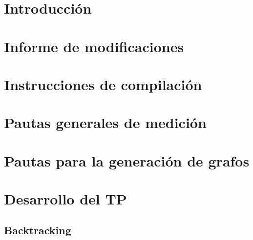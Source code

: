 \documentclass[12pt, a4paper, twoside]{article}
\begin{document}
{}

\newpage{\pagestyle{empty}\cleardoublepage}
\setcounter{page}{1}

\newpage{\pagestyle{empty}\tableofcontents\cleardoublepage}

\begin{TP3}
\section{Introducción}\label{sec:introduccion}

\newpage

\section{Informe de modificaciones}\label{sec:modificaciones}

\newpage

\section{Instrucciones de compilación}\label{sec:instrucciones}

\newpage

\section{Pautas generales de medición}\label{sec:medicion}

\newpage

\section{Pautas para la generación de grafos}\label{sec:generacion}

\newpage

\section{Desarrollo del TP}\label{sec:desarrollo}
  
  \subsection{Backtracking}\label{subsec:backtracking}
  
  \newpage


\end{TP3}
\end{document}
